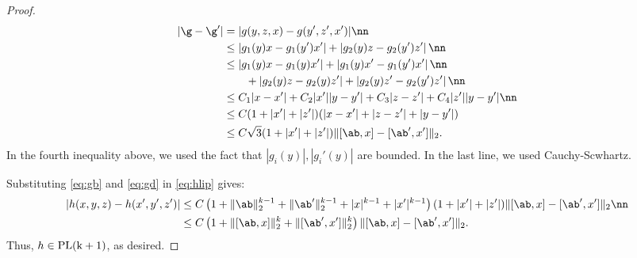 \begin{proof}
\begin{align}
|{\g-\g'}|&= |g(y,z,x)-g(y',z',x')| \nn\\
&\leq \left|g_1(y) x - g_1(y') x'\right|
 + \left|g_2(y)z-g_2(y')z'\right|\nn\\
 &\leq
\left|g_1(y) x - g_1(y) x'\right| +\left|g_1(y) x'- g_1(y') x'\right|\nn\\
 &\qquad+ \left|g_2(y)z-g_2(y)z'\right| + \left|g_2(y)z'-g_2(y')z'\right| \nn\\
&\leq C_1|x-x'| + C_2|x'||y-y'| + C_3|z-z'| + C_4|z'||y-y'|\nn\\
&\leq C(1+|x'| + |z'|)(|x-x'| + |z-z'| + |y-y'|)\\
&\leq C\sqrt{3}(1+|x'| + |z'|)\|[\ab,x]-[\ab',x']\|_2
.\label{eq:gd}
\end{align}
In the fourth inequality above, we used the fact that $|g_i(y)|,|g_i'(y)|$ are bounded. In the last line, we used Cauchy-Scwhartz.

Substituting \eqref{eq:gb} and \eqref{eq:gd} in \eqref{eq:hlip} gives:
\begin{align}
|h(x,y,z) - h(x',y',z')|  &\leq C\left(1+\|\ab\|_2^{k-1}+\|\ab'\|_2^{k-1}+|x|^{k-1}+|x'|^{k-1}\right)(1+|x'| + |z'|)\|[\ab,x]-[\ab',x']\|_2\nn \\
&\leq C\left(1+\|[\ab,x]\|_2^{k}+\|[\ab',x']\|_2^{k}\right)\|[\ab,x]-[\ab',x']\|_2.
\end{align}
Thus, $h\in\rm{PL}(k+1)$, as desired.
\end{proof}






